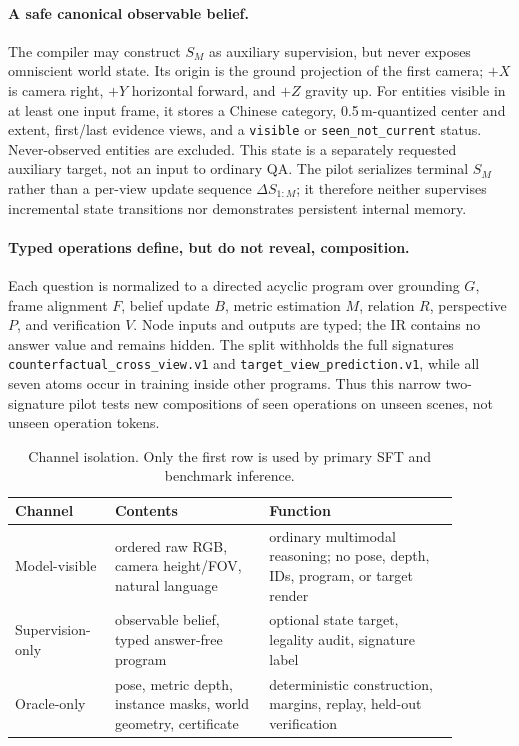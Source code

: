 \paragraph{A safe canonical observable belief.}
The compiler may construct $S_M$ as auxiliary supervision, but never exposes
omniscient world state.  Its origin is the ground projection of the first
camera; $+X$ is camera right, $+Y$ horizontal forward, and $+Z$ gravity up.
For entities visible in at least one input frame, it stores a Chinese category,
0.5\,m-quantized center and extent, first/last evidence views, and a
\texttt{visible} or \texttt{seen\_not\_current} status.  Never-observed entities
are excluded.  This state is a separately requested auxiliary target, not an
input to ordinary QA.  The pilot serializes terminal $S_M$ rather than a
per-view update sequence $\Delta S_{1:M}$; it therefore neither supervises
incremental state transitions nor demonstrates persistent internal memory.

\paragraph{Typed operations define, but do not reveal, composition.}
Each question is normalized to a directed acyclic program over grounding $G$,
frame alignment $F$, belief update $B$, metric estimation $M$, relation $R$,
perspective $P$, and verification $V$.  Node inputs and outputs are typed; the
IR contains no answer value and remains hidden.  The split withholds the full
signatures \texttt{counterfactual\_cross\_view.v1} and
\texttt{target\_view\_prediction.v1}, while all seven atoms occur in training
inside other programs.  Thus this narrow two-signature pilot tests new
compositions of seen operations on unseen scenes, not unseen operation tokens.

\begin{table}[t]
\centering
\small
\caption{Channel isolation.  Only the first row is used by primary SFT and
benchmark inference.}
\label{tab:contract}
\begin{tabular}{p{0.19\linewidth}p{0.31\linewidth}p{0.38\linewidth}}
\toprule
Channel & Contents & Function \\
\midrule
Model-visible & ordered raw RGB, camera height/FOV, natural language & ordinary
multimodal reasoning; no pose, depth, IDs, program, or target render \\
Supervision-only & observable belief, typed answer-free program & optional
state target, legality audit, signature label \\
Oracle-only & pose, metric depth, instance masks, world geometry, certificate &
deterministic construction, margins, replay, held-out verification \\
\bottomrule
\end{tabular}
\end{table}

